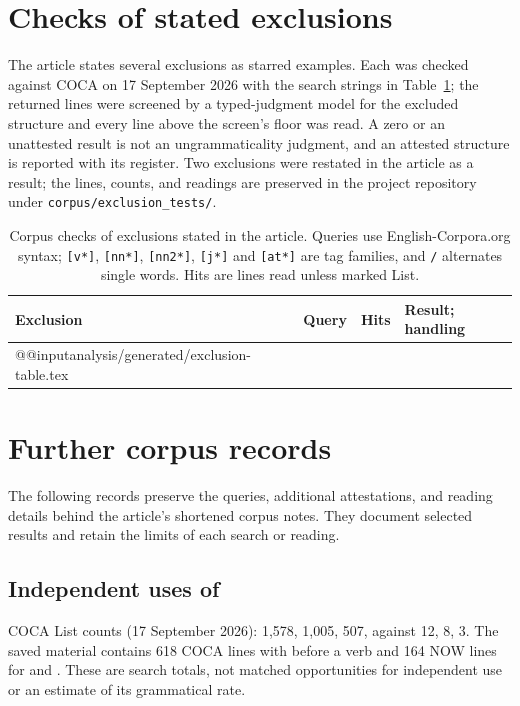 \documentclass[12pt]{article}
\makeatletter
\newcommand{\tablebody}[1]{\csname @@input\endcsname #1 }
\makeatother
\begin{document}
\section{Checks of stated exclusions}

The article states several exclusions as starred examples. Each was checked against COCA on 17 September 2026 with the search strings in Table~\ref{tab:exclusion-checks}; the returned lines were screened by a typed-judgment model for the excluded structure and every line above the screen's floor was read. A zero or an unattested result is not an ungrammaticality judgment, and an attested structure is reported with its register. Two exclusions were restated in the article as a result; the lines, counts, and readings are preserved in the project repository under \texttt{corpus/exclusion\_tests/}.

\begin{table}[H]
\centering\small
\caption{Corpus checks of exclusions stated in the article. Queries use English-Corpora.org syntax; \texttt{[v*]}, \texttt{[nn*]}, \texttt{[nn2*]}, \texttt{[j*]} and \texttt{[at*]} are tag families, and \texttt{/} alternates single words. Hits are lines read unless marked List.}\label{tab:exclusion-checks}
\setlength{\tabcolsep}{3pt}
\begin{tabular}{>{\raggedright\arraybackslash}p{3.1cm}>{\raggedright\arraybackslash}p{3.3cm}>{\raggedright\arraybackslash}p{2.6cm}>{\raggedright\arraybackslash}p{5.2cm}}
\toprule
Exclusion & Query & Hits & Result; handling \\
\midrule
\tablebody{analysis/generated/exclusion-table.tex}
\bottomrule
\end{tabular}
\end{table}

\section{Further corpus records}

The following records preserve the queries, additional attestations, and reading details behind the article's shortened corpus notes. They document selected results and retain the limits of each search or reading.

\subsection{Independent uses of }

COCA List counts (17 September 2026):  1,578,  1,005,  507, against  12,  8,  3. The saved material contains 618 COCA lines with  before a verb and 164 NOW lines for  and . These are search totals, not matched opportunities for independent use or an estimate of its grammatical rate.
\end{document}
